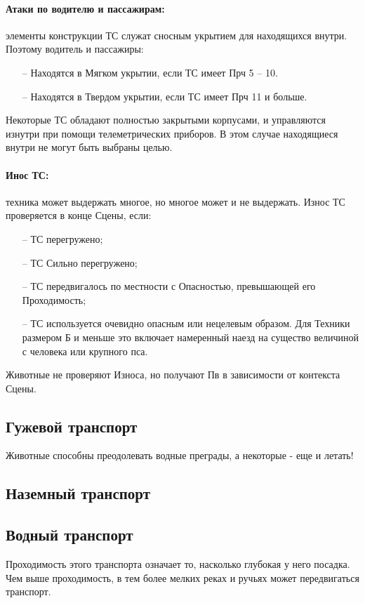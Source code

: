 \paragraph{Атаки по водителю и пассажирам:} элементы конструкции ТС служат сносным укрытием для находящихся внутри. Поэтому водитель и пассажиры:
\begin{itemize}
    \item[--] Находятся в Мягком укрытии, если ТС имеет Прч 5 – 10.
    \item[--] Находятся в Твердом укрытии, если ТС имеет Прч 11 и больше.
\end{itemize}
Некоторые ТС обладают полностью закрытыми корпусами, и управляются изнутри при помощи телеметрических приборов. В этом случае находящиеся внутри не могут быть выбраны целью.
\paragraph{Инос ТС:} техника может выдержать многое, но многое может и не выдержать. Износ ТС проверяется в конце Сцены, если:
\begin{itemize}
  \item[--] ТС перегружено;
  \item[--] ТС Сильно перегружено;
  \item[--] ТС передвигалось по местности с Опасностью, превышающей его Проходимость;
  \item[--] ТС используется очевидно опасным или нецелевым образом. Для Техники размером Б и меньше это включает намеренный наезд на существо величиной с человека или крупного пса.
\end{itemize}
Животные не проверяют Износа, но получают Пв в зависимости от контекста Сцены.

\subsection{Гужевой транспорт}
Животные способны преодолевать водные преграды, а некоторые - еще и летать!

\subsection{Наземный транспорт}

\subsection{Водный транспорт}
Проходимость этого транспорта означает то, насколько глубокая у него посадка. Чем выше проходимость, в тем более мелких реках и ручьях может передвигаться транспорт.
